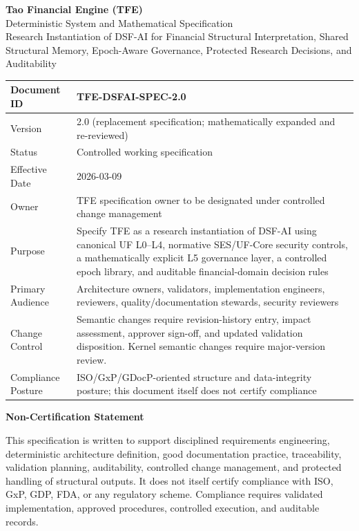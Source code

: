 \documentclass[11pt]{report}
\begin{document}
\begin{titlepage}
\centering
{\Huge \textbf{Tao Financial Engine (TFE)}}\\[0.35cm]
{\LARGE Deterministic System and Mathematical Specification}\\[0.25cm]
{\Large Research Instantiation of DSF-AI for Financial Structural Interpretation, Shared Structural Memory, Epoch-Aware Governance, Protected Research Decisions, and Auditability}\\[0.9cm]

\renewcommand{\arraystretch}{1.18}
\begin{tabularx}{\textwidth}{|p{}|Y|}
\hline
Document ID & TFE-DSFAI-SPEC-2.0 \\\hline
Version & 2.0 (replacement specification; mathematically expanded and re-reviewed) \\\hline
Status & Controlled working specification \\\hline
Effective Date & 2026-03-09 \\\hline
Owner & TFE specification owner to be designated under controlled change management \\\hline
Purpose & Specify TFE as a research instantiation of DSF-AI using canonical UF L0--L4, normative SES/UF-Core security controls, a mathematically explicit L5 governance layer, a controlled epoch library, and auditable financial-domain decision rules \\\hline
Primary Audience & Architecture owners, validators, implementation engineers, reviewers, quality/documentation stewards, security reviewers \\\hline
Change Control & Semantic changes require revision-history entry, impact assessment, approver sign-off, and updated validation disposition. Kernel semantic changes require major-version review. \\\hline
Compliance Posture & ISO/GxP/GDocP-oriented structure and data-integrity posture; this document itself does not certify compliance \\\hline
\end{tabularx}

\vfill
{\large \textbf{Non-Certification Statement}}\\[0.2cm]
\parbox{0.93\textwidth}{This specification is written to support disciplined requirements engineering, deterministic architecture definition, good documentation practice, traceability, validation planning, auditability, controlled change management, and protected handling of structural outputs. It does not itself certify compliance with ISO, GxP, GDP, FDA, or any regulatory scheme. Compliance requires validated implementation, approved procedures, controlled execution, and auditable records.}
\vfill
\end{titlepage}
\end{document}
